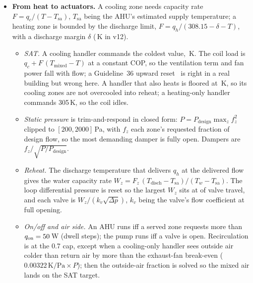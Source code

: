 \documentclass{article}
\begin{document}
\begin{itemize}
\begin{itemize}
  \item \emph{Setback bursts.} A running handler pays the ventilation load of every zone it serves. The floor (the out-of-hours band of 289--298\,K widened by \ParNightLowExt{}/\ParNightHighExt\,K) is therefore held by requesting \ParQSbW\,W from any zone that crosses it until it is \ParSbHystK\,K inside, and the handler is off otherwise. Holding the floor with the PI loops instead kept a handler running for \VthreeAhuOnUnocc{} of the unoccupied steps on the coldest scenario.
  \end{itemize}
\item \textbf{From heat to actuators.} A cooling zone needs capacity rate $F = q_c/(T - T_{\text{sa}})$, $T_{\text{sa}}$ being the AHU's estimated supply temperature; a heating zone is bounded by the discharge limit, $F = q_h/(308.15 - \delta - T)$, with a discharge margin $\delta$ (\ParDischMarginK\,K in v12).
  \begin{itemize}
  \item \emph{SAT.} A cooling handler commands the coldest value, \ParSatCoolHi\,K. The coil load is $q_c + F\,(T_{\text{mixed}} - T)$ at a constant COP, so the ventilation term and fan power fall with flow; a Guideline~36 upward reset~\citep{ashrae2021g36,taylor2018vav} is right in a real building but wrong here. A handler that also heats is floored at \ParSatMixFloor\,K, so its cooling zones are not overcooled into reheat; a heating-only handler commands 305\,K, so the coil idles.
  \item \emph{Static pressure} is trim-and-respond in closed form: $P = P_{\text{design}}\max_z f_z^2$ clipped to $[200, 2000]$\,Pa, with $f_z$ each zone's requested fraction of design flow, so the most demanding damper is fully open. Dampers are $f_z/\sqrt{P/P_{\text{design}}}$.
  \item \emph{Reheat.} The discharge temperature that delivers $q_h$ at the delivered flow gives the water capacity rate $W_z = F_z\,(T_{\text{disch}} - T_{\text{sa}})/(T_w - T_{\text{sa}})$. The loop differential pressure is reset so the largest $W_z$ sits at \ParValveTarget{} of valve travel, and each valve is $W_z/(k_v \sqrt{\Delta p})$, $k_v$ being the valve's flow coefficient at full opening.
  \item \emph{On/off and air side.} An AHU runs iff a served zone requests more than $q_{\text{on}} = 50$\,W (dwell \ParMinOnSteps{} steps); the pump runs iff a valve is open. Recirculation is at the 0.7 cap, except when a cooling-only handler sees outside air colder than return air by more than the exhaust-fan break-even ($0.00322\,\text{K/Pa}\times P$); then the outside-air fraction is solved so the mixed air lands on the SAT target.

\end{itemize}
\end{itemize}
\end{document}

